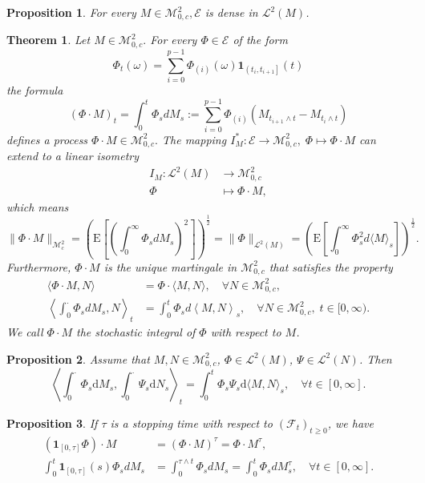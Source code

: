 \documentclass{article}
\newtheorem{proposition}{Proposition}[section]
\newtheorem{theorem}{Theorem}[section]
\theoremstyle{nonumberplain}
\begin{document}
\begin{proposition}
For every $M \in \mathscr{M}^2_{0,c}, \mathscr{E}$ is dense in $\mathscr{L}^{2}(M)$.
\end{proposition}

\begin{theorem}
Let $M \in \mathscr{M}^2_{0,c} .$ For every $\Phi \in \mathscr{E}$ of the form
\[
\Phi_{t}(\omega)=\sum_{i=0}^{p-1} \Phi_{(i)}(\omega) \mathbf{1}_{\left(t_{i}, t_{i+1}\right]}(t)
\]
the formula
\[
(\Phi \cdot M)_{t}=\int_{0}^{t}\Phi_sdM_s:=\sum_{i=0}^{p-1} \Phi_{(i)}\left(M_{t_{i+1} \wedge t}-M_{t_{i} \wedge t}\right)
\]
defines a process $\Phi \cdot M \in \mathscr{M}^2_{0,c}.$ The mapping $I_M^*:\mathscr{E}\to\mathscr{M}^2_{0,c},\;\Phi \mapsto \Phi \cdot M$ can extend to a linear isometry
\begin{align*}
I_M:\mathscr{L}^{2}(M)&\longrightarrow\mathscr{M}^2_{0,c}\\
\Phi &\longmapsto \Phi \cdot M,
\end{align*}
which means
\[
\|\Phi \cdot M\|_{\mathscr{M}^2_c}=\left(\mathrm{E}\left[\left(\int_{0}^{\infty}\Phi_sdM_s\right)^2\right]\right)^{\tfrac{1}{2}}=\|\Phi\|_{\mathscr{L}^2(M)}=\left(\mathrm{E}\left[\int_{0}^{\infty} \Phi_{s}^{2} d\langle M\rangle_{s}\right]\right)^{\tfrac{1}{2}}.
\]
Furthermore, $\Phi \cdot M$ is the unique martingale in $\mathscr{M}^2_{0,c}$ that satisfies the property
\begin{align*}
\langle \Phi \cdot M, N\rangle&= \Phi \cdot\langle M, N\rangle, \quad \forall N \in\mathscr{M}^2_{0,c},\\
\left\langle \int_{0}^{\cdot}\Phi_sdM_s, N\right\rangle_t&= \int_{0}^{t}\Phi_sd\left\langle M, N\right\rangle_s, \quad \forall N \in\mathscr{M}^2_{0,c},\;t\in[0,\infty).
\end{align*}
We call $\Phi \cdot M$ the stochastic integral of $\Phi$ with respect to $M$.
\end{theorem}

\begin{proposition}
	Assume that $M,N\in\mathscr{M}^2_{0,c}$, $\Phi\in\mathscr{L}^2(M)$, $\Psi\in\mathscr{L}^2(N)$. Then
	\[
	\left\langle\int_{0}^\cdot \Phi_{s} \mathrm{d} M_{s}, \int_{0}^\cdot \Psi_{s} \mathrm{d} N_{s}\right\rangle_{t}=\int_{0}^{t} \Phi_{s}\Psi_{s} \mathrm{d}\langle M, N\rangle_{s},\quad\forall t\in[0,\infty].
	\]
\end{proposition}

\begin{proposition}
If $\tau$ is a stopping time with respect to $(\mathcal{F}_t)_{t\ge0}$, we have
\begin{align*}
\left(\mathbf{1}_{[0, \tau]} \Phi\right) \cdot M&=(\Phi \cdot M)^{\tau}=\Phi \cdot M^{\tau},\\
\int_{0}^{t}\mathbf{1}_{[0, \tau]}(s)\Phi_sdM_s&=\int_{0}^{\tau\wedge t}\Phi_sdM_s=\int_{0}^{ t}\Phi_sdM_s^{\tau},\quad\forall t\in[0,\infty].
\end{align*}
\end{proposition}
\end{document}
